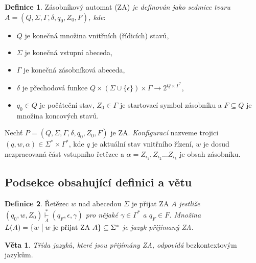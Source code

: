 \documentclass[a4paper,twocolumn,11pt]{article}[06-03-2022]
\theoremstyle{definition}
\newtheorem{theorem}{Definice}
\newtheorem{sentence}{Věta}
\begin{document}
\begin{theorem}
    Zásobníkový automat (ZA) \emph{je definován jako sedmice tvaru $A = (Q, \Sigma, \Gamma, \delta, q_0, Z_0, F)$, kde}: 
    \begin{itemize}
        \item $Q$ je konečná množina vnitřních (řídicích) stavů,
        \item $\Sigma$ je konečná vstupní abeceda,
        \item $\Gamma$ je konečná zásobníková abeceda,
        \item $\delta$ je přechodová funkce $Q \times (\Sigma \cup \{\epsilon\}) \times \Gamma \rightarrow 2^{Q \times \Gamma^\ast}$,
        \item $q_0 \in Q$ je počáteční stav, $Z_0 \in \Gamma$ je startovací symbol zásobníku a $F \subseteq Q$ je množina koncových stavů.
    \end{itemize}
\end{theorem}
Nechť $P = (Q, \Sigma, \Gamma, \delta, q_0, Z_0, F)$ je ZA. \emph{Konfigurací} nazveme trojici $(q,w,\alpha) \in \Sigma^\ast \times \Gamma^\ast$, kde $q$ je aktuální stav vnitřního řízení, $w$ je dosud nezpracovaná část vstupního řetězce a $\alpha = Z_{i_1}, Z_{i_2} \ldots Z_{i_k}$ je obsah zásobníku.

\subsection{Podsekce obsahující definici a větu}
\begin{theorem}
    Řetězec $w$ nad abecedou $\Sigma$ je přijat ZA $A$ \emph{jestliže $(q_0, w, Z_0) \overset{\ast}{\underset{A}{\vdash}} (q_F, \epsilon, \gamma)$ pro nějaké $\gamma \in \Gamma^\ast$ a $q_F \in F$.
    Množina $L(A) = \{w \bigm| w \textrm{ je přijat ZA } A \} \subseteq \Sigma^\ast$ je jazyk přijímaný ZA.}
\end{theorem}
\begin{sentence}
    \emph{Třída jazyků, které jsou přijímány ZA, odpovídá} bezkontextovým jazykům.
\end{sentence}
\end{document}
